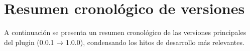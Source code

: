 \documentclass[a4paper, 12pt]{book}
\begin{document}




\section{Resumen cronológico de versiones}
\label{sec:resumen-versiones}
A continuación se presenta un resumen cronológico de las versiones principales del plugin (0.0.1 → 1.0.0), condensando los hitos de desarrollo más relevantes.
\end{document}
